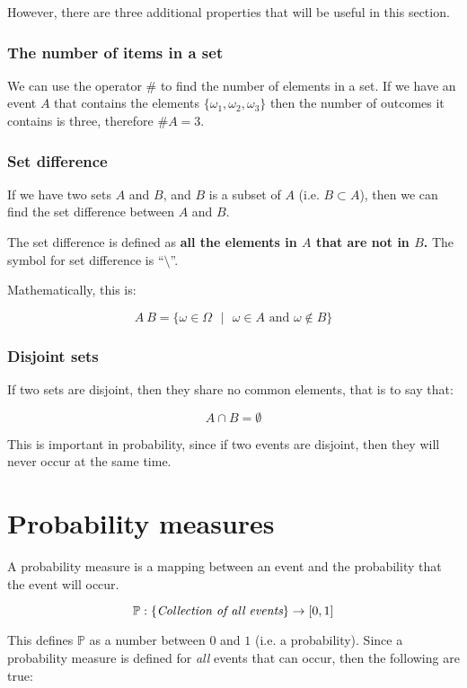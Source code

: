 \documentclass{article}
\begin{document}
However, there are three additional properties that will be useful in this
section.

\subsubsection{The number of items in a set}

We can use the operator $\#$ to find the number of elements in a set. If we have
an event $A$ that contains the elements $\{\omega_1, \omega_2, \omega_3\}$ then
the number of outcomes it contains is three, therefore $\#A = 3$.

\subsubsection{Set difference}

If we have two sets $A$ and $B$, and $B$ is a subset of $A$ (i.e. $B \subset A$), then we can find the set difference between $A$ and $B$.

The set difference is defined as {\bf all the elements in $A$ that are not in
$B$.} The symbol for set difference is ``$\setminus$''.

Mathematically, this is:

\[
	A \ B = \{\omega \in \Omega \textrm{ } \vert \textrm{ } \omega \in A \textrm{ and } \omega \not\in B\}
\]

\subsubsection{Disjoint sets}

If two sets are disjoint, then they share no common elements, that is to say
that:

\[
	A \cap B = \emptyset
\]

This is important in probability, since if two events are disjoint, then they
will never occur at the same time.

\section{Probability measures}

A probability measure is a mapping between an event and the probability that the
event will occur.

\[
	\mathbb{P} : \{\textrm{\it Collection of all events}\} \rightarrow [0,1]
\]

This defines $\mathbb{P}$ as a number between $0$ and $1$ (i.e. a probability).
Since a probability measure is defined for {\it all} events that can occur, then
the following are true:
\end{document}
